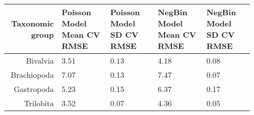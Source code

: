 \begin{table}[ht]
\centering
\begin{tabular}{rllll}
  \hline
Taxonomic group & Poisson Model Mean CV RMSE & Poisson Model SD CV RMSE & NegBin Model Mean CV RMSE & NegBin Model SD CV RMSE \\ 
  \hline
Bivalvia & 3.51 & 0.13 & 4.18 & 0.08 \\ 
  Brachiopoda & 7.07 & 0.13 & 7.47 & 0.07 \\ 
  Gastropoda & 5.23 & 0.15 & 6.37 & 0.17 \\ 
  Trilobita & 3.52 & 0.07 & 4.36 & 0.05 \\ 
   \hline
\end{tabular}
\label{tab:cv_rmse}
\end{table}
